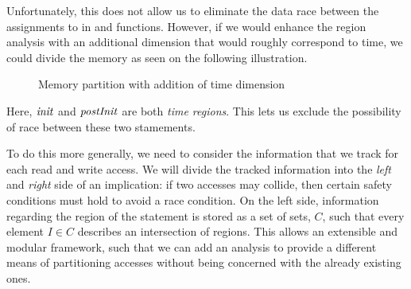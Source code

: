 \documentclass[..thesis.tex]{subfiles}
\newcommand{\opacity}{0.8}
\newcommand{\drawcube}[7]
{
      \filldraw[opacity=\opacity, #7, draw=black, dashed, xzp=#2] (#1,#3) rectangle (#4,#6);
      \filldraw[opacity=\opacity, #7, draw=black, dashed, xzp=#5] (#1,#3) rectangle (#4,#6);
      \filldraw[opacity=\opacity, #7, draw=black, dashed, xyp=#3] (#1,#2) rectangle (#4,#5);
      \filldraw[opacity=\opacity, #7, draw=black, dashed, xyp=#6] (#1,#2) rectangle (#4,#5);
      \filldraw[opacity=\opacity, #7, draw=black, dashed, yzp=#4] (#2,#3) rectangle (#5,#6);
}
\newcommand{\drawcubeoverz}[5]
{
 \drawcube{#1}{#2}{0}{#3}{#4}{\cubez}{#5}
}
\newcommand{\drawoutercube}
{
      \draw[thick,-] (0,0,0) -- ++(\cubex,0,0) -- ++(0,0,\cubez) -- node [anchor = north] {$B$} ++(-0.5*\cubex,0,0) --  node [anchor = north] {$A$} ++(-0.5*\cubex,0,0)  --   ++(0,0,-\cubez);
      \draw[thick,-] (0,\cubey,0) -- ++(\cubex,0,0) -- ++(0,0,\cubez) -- ++(-\cubex,0,0) --   ++(0,0,-\cubez)  ;

      \draw[thick,-] (0,0,0) -- (0,\cubey,0);
      \draw[thick,-] (\cubex,0,0) -- (\cubex,\cubey,0);
      \draw[thick,-] (\cubex,0,\cubez) -- ++(0,\cubey,0);
      \draw[thick,-] (0,0,\cubez) -- (0,\cubey,\cubez);
}
\newcommand{\initColor}{red}
\newcommand{\initLColor}{\initColor!30}
\newcommand{\initRColor}{\initColor!75}
\newcommand{\postInitColor}{blue}
\newcommand{\postInitLColor}{\postInitColor!30}
\newcommand{\postInitRColor}{\postInitColor!75}
\begin{document}
Unfortunately, this does not allow us to eliminate the data race between the assignments to  in  and  functions.
However, if we would enhance the region analysis with an additional dimension that would roughly correspond to time,
we could divide the memory as seen on the following illustration. 

\begin{figure}[H]
  \centering
    \caption{Memory partition with addition of time dimension}
\end{figure}

Here, $\mathit{init}$ and $\mathit{postInit}$ are both \textit{time regions}.
%
This lets us exclude the possibility of race between these two stamements. 
%

To do this more generally, we need to consider the information that we track for
each read and write access.
%
We will divide the tracked information into the \textit{left} and \textit{right}
side of an implication: if two accesses may collide, then certain safety conditions
must hold to avoid a race condition.
%
On the left side, information regarding the region of the statement is stored as a set of sets, $C$,
such that every element $I \in C$ describes an intersection of regions. This
allows an extensible and modular framework, such that we can add an analysis to
provide a different means of partitioning accesses without being concerned
with the already existing ones. 
\end{document}

